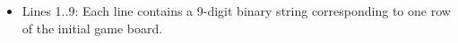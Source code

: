 \begin{itemize}
	\item      Lines 1..9: Each line contains a 9-digit binary string corresponding         to one row of the initial game board.    
\end{itemize}

\